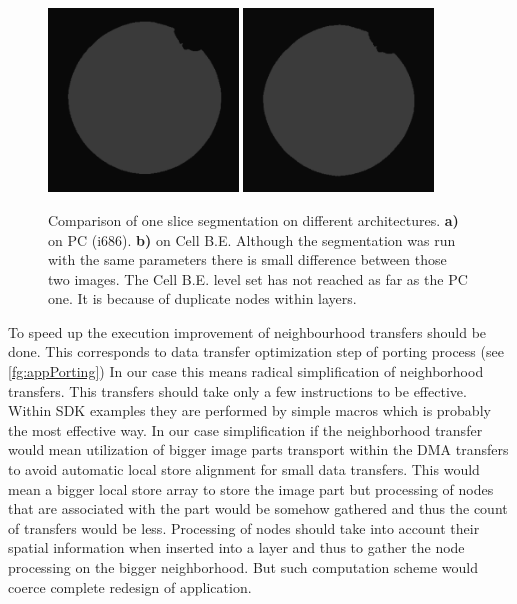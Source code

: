 \begin{figure}
    \centering
    \includegraphics[width=0.45\textwidth]{data/png/pcSlice}
    \includegraphics[width=0.45\textwidth]{data/png/cellSlice}
    \caption[Comparison of one slice segmented on different architectures]{Comparison of one slice segmentation on different architectures.
    \textbf{a)} on PC (i686).
    \textbf{b)} on Cell B.E.
Although the segmentation was run with the same parameters there is small difference between those two images.
The Cell B.E. level set has not reached as far as the PC one.
It is because of duplicate nodes within layers.
}
    \label{fg:sliceComparison}
\end{figure}

\par
To speed up the execution improvement of neighbourhood transfers should be done.
This corresponds to data transfer optimization step of porting process (see \ref{fg:appPorting})
In our case this means radical simplification of neighborhood transfers.
This transfers should take only a few instructions to be effective.
Within SDK examples they are performed by simple macros which is probably the most effective way.
In our case simplification if the neighborhood transfer would mean utilization of bigger image parts transport within the DMA transfers to avoid automatic local store alignment for small data transfers.
This would mean a bigger local store array to store the image part but processing of nodes that are associated with the part would be somehow gathered and thus the count of transfers would be less.
Processing of nodes should take into account their spatial information when inserted into a layer and thus to gather the node processing on the bigger neighborhood.
But such computation scheme would coerce complete redesign of application.

